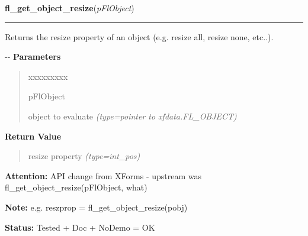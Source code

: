 \hspace{.8\funcindent}\begin{boxedminipage}{\funcwidth}

    \raggedright \textbf{fl\_get\_object\_resize}(\textit{pFlObject})

    \vspace{-1.5ex}

    \rule{\textwidth}{0.5\fboxrule}
\setlength{\parskip}{2ex}

Returns the resize property of an object (e.g. resize all, resize
none, etc..).

-{}-
\setlength{\parskip}{1ex}
      \textbf{Parameters}
      \vspace{-1ex}

      \begin{quote}
        \begin{Ventry}{xxxxxxxxx}

          \item[pFlObject]


object to evaluate
            {\it (type=pointer to xfdata.FL\_OBJECT)}

        \end{Ventry}

      \end{quote}

      \textbf{Return Value}
    \vspace{-1ex}

      \begin{quote}

resize property
      {\it (type=int\_pos)}

      \end{quote}

\textbf{Attention:} 
API change from XForms - upstream was
fl\_get\_object\_resize(pFlObject, what)


\textbf{Note:} 
e.g. reszprop = fl\_get\_object\_resize(pobj)


\textbf{Status:} 
Tested + Doc + NoDemo = OK


    \end{boxedminipage}

    \label{xformslib:flbasic:fl_set_object_gravity}

    \vspace{0.5ex}

